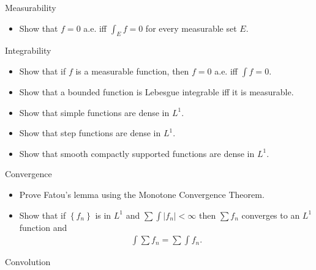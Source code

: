 Measurability

\begin{itemize}
\tightlist
\item
  Show that \(f=0\) a.e. iff \(\int_E f = 0\) for every measurable set
  \(E\).
\end{itemize}

Integrability

\begin{itemize}
\tightlist
\item
  Show that if \(f\) is a measurable function, then \(f=0\) a.e. iff
  \(\int f = 0\).
\item
  Show that a bounded function is Lebesgue integrable iff it is
  measurable.
\item
  Show that simple functions are dense in \(L^1\).
\item
  Show that step functions are dense in \(L^1\).
\item
  Show that smooth compactly supported functions are dense in \(L^1\).
\end{itemize}

Convergence

\begin{itemize}
\tightlist
\item
  Prove Fatou's lemma using the Monotone Convergence Theorem.
\item
  Show that if \(\left\{{f_n}\right\}\) is in \(L^1\) and
  \(\sum \int {\left\lvert {f_n} \right\rvert} < \infty\) then
  \(\sum f_n\) converges to an \(L^1\) function and
  \begin{align*}\int \sum f_n = \sum \int f_n.\end{align*}
\end{itemize}

Convolution

